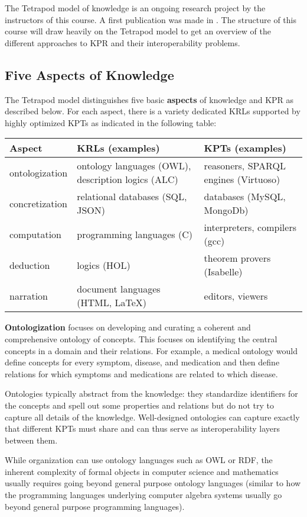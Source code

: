 The Tetrapod model of knowledge is an ongoing research project by the instructors of this course.
A first publication was made in \cite{CFKR:tetrapod:19}.
The structure of this course will draw heavily on the Tetrapod model to get an overview of the different approaches to KPR and their interoperability problems.

\subsection{Five Aspects of Knowledge}

The Tetrapod model distinguishes five basic \textbf{aspects} of knowledge and KPR as described below.
For each aspect, there is a variety dedicated KRLs supported by highly optimized KPTs as indicated in the following table:

\begin{center}
\begin{tabular}{lll}
Aspect & KRLs (examples) & KPTs (examples) \\
\hline
ontologization & ontology languages (OWL), description logics (ALC) & reasoners, SPARQL engines (Virtuoso) \\
concretization & relational databases (SQL, JSON) & databases (MySQL, MongoDb) \\
computation & programming languages (C) & interpreters, compilers (gcc) \\
deduction & logics (HOL) & theorem provers (Isabelle) \\
narration & document languages (HTML, LaTeX) & editors, viewers
\end{tabular}
\end{center}

\textbf{Ontologization} focuses on developing and curating a coherent and comprehensive ontology of concepts.
This focuses on identifying the central concepts in a domain and their relations.
For example, a medical ontology would define concepts for every symptom, disease, and medication and then define relations for which symptoms and medications are related to which disease.

Ontologies typically abstract from the knowledge: they standardize identifiers for the concepts and spell out some properties and relations but do not try to capture all details of the knowledge.
Well-designed ontologies can capture exactly that different KPTs must share and can thus serve as interoperability layers between them.

While organization can use ontology languages such as OWL or RDF, the inherent complexity of formal objects in computer science and mathematics usually requires going beyond general purpose ontology languages (similar to how the programming languages underlying computer algebra systems usually go beyond general purpose programming languages).

